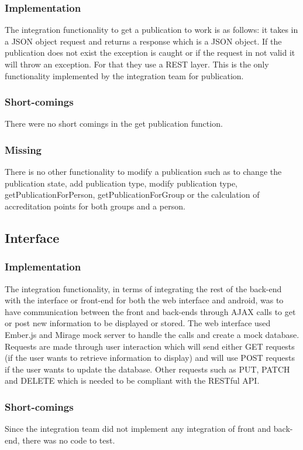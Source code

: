 \documentclass{article}
\begin{document}
		\subsubsection{Implementation}
			The integration functionality to get a publication to work is as follows: it takes in a JSON object request and returns a response which is a JSON object. If the publication does not exist the exception is caught or if the request in not valid it will throw an exception. For that they use a REST layer. This is the only functionality implemented by the integration team for publication.
		\subsubsection{Short-comings}
			There were no short comings in the get publication function.
		\subsubsection{Missing}
			There is no other functionality to modify a publication such as to change the publication state, add publication type, modify publication type, getPublicationForPerson, getPublicationForGroup or the calculation of accreditation points for both groups and a person.
		
    \subsection{Interface}
        \subsubsection{Implementation}
        The integration functionality, in terms of integrating the rest of the back-end with the interface or front-end for both the web interface and android, was to have communication between the front and back-ends through AJAX calls to get or post new information to be displayed or stored. The web interface used Ember.js and Mirage mock server to handle the calls and create a mock database. Requests are made through user interaction which will send either GET requests (if the user wants to retrieve information to display) and will use POST requests if the user wants to update the database. Other requests such as PUT, PATCH and DELETE which is needed to be compliant with the RESTful API.
        \subsubsection{Short-comings}
        Since the integration team did not implement any integration of front and back-end, there was no code to test.
\end{document}
